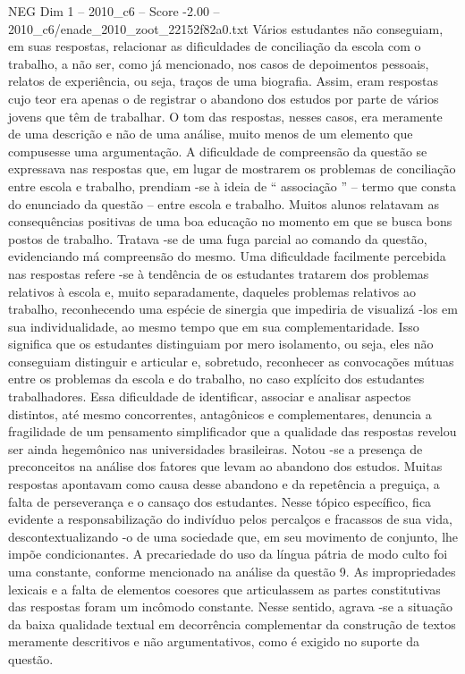 \begin{textsample}{NEG Dim 1 – 2010\_c6 – Score -2.00 – 2010\_c6/enade\_2010\_zoot\_22152f82a0.txt}
Vários estudantes não conseguiam, em suas respostas, relacionar as dificuldades de conciliação da escola com o trabalho, a não ser, como já mencionado, nos casos de depoimentos pessoais, relatos de experiência, ou seja, traços de uma biografia.
Assim, eram respostas cujo teor era apenas o de registrar o abandono dos estudos por parte de vários jovens que têm de trabalhar.
O tom das respostas, nesses casos, era meramente de uma descrição e não de uma análise, muito menos de um elemento que compusesse uma argumentação.
A dificuldade de compreensão da questão se expressava nas respostas que, em lugar de mostrarem os problemas de conciliação entre escola e trabalho, prendiam -se à ideia de “ associação ” – termo que consta do enunciado da questão – entre escola e trabalho.
Muitos alunos relatavam as consequências positivas de uma boa educação no momento em que se busca bons postos de trabalho.
Tratava -se de uma fuga parcial ao comando da questão, evidenciando má compreensão do mesmo.
Uma dificuldade facilmente percebida nas respostas refere -se à tendência de os estudantes tratarem dos problemas relativos à escola e, muito separadamente, daqueles problemas relativos ao trabalho, reconhecendo uma espécie de sinergia que impediria de visualizá -los em sua individualidade, ao mesmo tempo que em sua complementaridade.
Isso significa que os estudantes distinguiam por mero isolamento, ou seja, eles não conseguiam distinguir e articular e, sobretudo, reconhecer as convocações mútuas entre os problemas da escola e do trabalho, no caso explícito dos estudantes trabalhadores.
Essa dificuldade de identificar, associar e analisar aspectos distintos, até mesmo concorrentes, antagônicos e complementares, denuncia a fragilidade de um pensamento simplificador que a qualidade das respostas revelou ser ainda hegemônico nas universidades brasileiras.
Notou -se a presença de preconceitos na análise dos fatores que levam ao abandono dos estudos.
Muitas respostas apontavam como causa desse abandono e da repetência a preguiça, a falta de perseverança e o cansaço dos estudantes.
Nesse tópico específico, fica evidente a responsabilização do indivíduo pelos percalços e fracassos de sua vida, descontextualizando -o de uma sociedade que, em seu movimento de conjunto, lhe impõe condicionantes.
A precariedade do uso da língua pátria de modo culto foi uma constante, conforme mencionado na análise da questão 9.
As impropriedades lexicais e a falta de elementos coesores que articulassem as partes constitutivas das respostas foram um incômodo constante.
Nesse sentido, agrava -se a situação da baixa qualidade textual em decorrência complementar da construção de textos meramente descritivos e não argumentativos, como é exigido no suporte da questão.

\end{textsample}

